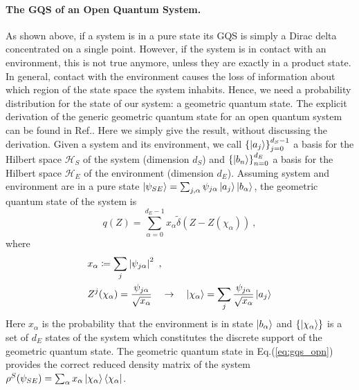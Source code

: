 \documentclass[draft,nofootinbib,pre,twocolumn,showpacs,showkeys,preprintnumbers,floatfix]{revtex4-1}
\newcommand{\1}{\mathbbm{1}}
\begin{document}
\paragraph*{The GQS of an Open Quantum System.}
As shown above, if a system is in a pure state its GQS is simply a Dirac delta concentrated
on a single point. However, if the system is in contact with an environment, this is not true 
anymore, unless they are exactly in a product state. In general, contact with the environment
causes the loss of information about which region of the state space the system inhabits. Hence, 
we need a probability distribution for the state of our system: a geometric quantum state. The explicit 
derivation of the generic geometric quantum state for an open quantum system can be found 
in Ref.\cite{Anza20a}. Here we simply give the result, without discussing the derivation. 
Given a system and its environment, we call $\left\{ \ket{a_j}\right\}_{j=0}^{d_S-1}$ a basis for 
the Hilbert space $\mathcal{H}_S$ of the system (dimension $d_S$) and 
$\left\{ \ket{b_n}\right\}_{n=0}^{d_E}$ a basis for the Hilbert space $\mathcal{H}_E$ 
of the environment (dimension $d_E$). Assuming system and environment are in 
a pure state $\ket{\psi_{SE}} = \sum_{j,\alpha}\psi_{j\alpha}\ket{a_j}\ket{b_\alpha}$, the 
geometric quantum state of the system is
\begin{equation}
q(Z) = \sum_{\alpha=0}^{d_E-1} x_\alpha \widetilde{\delta}\left( Z-Z(\chi_\alpha)\right)~,\label{eq:gqs_opn}
\end{equation}
where 
\begin{subequations}\label{eq:def_xchi}
\begin{align}
&x_\alpha \coloneqq \sum_j \left\vert \psi_{j\alpha}\right\vert^2~,\\
&Z^j(\chi_\alpha) = \frac{\psi_{j\alpha}}{\sqrt{x_\alpha}}\quad \to \quad \ket{\chi_\alpha} = \sum_j \frac{\psi_{j\alpha}}{\sqrt{x_\alpha}}\ket{a_j}
\end{align}\label{eq:xgammas}
\end{subequations}
Here $x_\alpha$ is the probability that the environment is in state $\ket{b_\alpha}$ and $\left\{\ket{\chi_\alpha}\right\}$ 
is a set of $d_E$ states of the system which constitutes the discrete support of the geometric 
quantum state. The geometric quantum state in Eq.(\ref{eq:gqs_opn}) provides the correct reduced density matrix of the system
$\rho^{S}(\psi_{SE}) = \sum_\alpha x_\alpha \ket{\chi_\alpha}\bra{\chi_\alpha}$.
\end{document}
